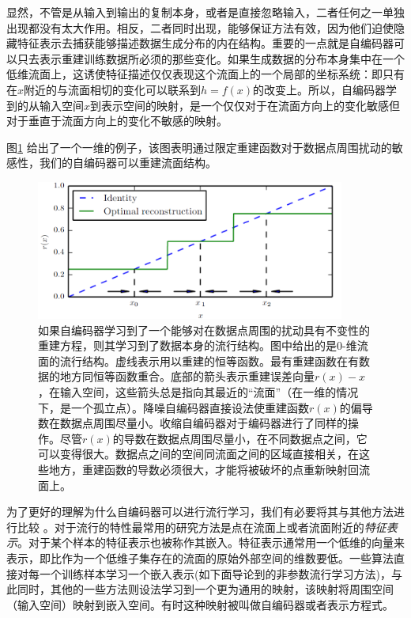 显然，不管是从输入到输出的复制本身，或者是直接忽略输入，二者任何之一单独出现都没有太大作用。相反，二者同时出现，能够保证方法有效，因为他们迫使隐藏特征表示去捕获能够描述数据生成分布的内在结构。重要的一点就是自编码器可以只去表示重建训练数据所必须的那些变化。如果生成数据的分布本身集中在一个低维流面上，这诱使特征描述仅仅表现这个流面上的一个局部的坐标系统：即只有在$x$附近的与流面相切的变化可以联系到$h = f(x)$的改变上。所以，自编码器学到的从输入空间$x$到表示空间的映射，是一个仅仅对于在流面方向上的变化敏感但对于垂直于流面方向上的变化不敏感的映射。

图\ref{fig:14.7} 给出了一个一维的例子，该图表明通过限定重建函数对于数据点周围扰动的敏感性，我们的自编码器可以重建流面结构。
\begin{figure}[htbp] %
   \centering
   \includegraphics[width=4in]{fig/chap14/14_7.png} 
   \caption{如果自编码器学习到了一个能够对在数据点周围的扰动具有不变性的重建方程，则其学习到了数据本身的流行结构。图中给出的是0-维流面的流行结构。虚线表示用以重建的恒等函数。最有重建函数在有数据的地方同恒等函数重合。底部的箭头表示重建误差向量$r(x)-x$，在输入空间，这些箭头总是指向其最近的“流面”（在一维的情况下，是一个孤立点）。降噪自编码器直接设法使重建函数$r(x)$的偏导数在数据点周围尽量小。收缩自编码器对于编码器进行了同样的操作。尽管$r(x)$的导数在数据点周围尽量小，在不同数据点之间，它可以变得很大。数据点之间的空间同流面之间的区域直接相关，在这些地方，重建函数的导数必须很大，才能将被破坏的点重新映射回流面上。}
   \label{fig:14.7}
\end{figure}

为了更好的理解为什么自编码器可以进行流行学习，我们有必要将其与其他方法进行比较 。对于流行的特性最常用的研究方法是点在流面上或者流面附近的\emph{特征表示}。对于某个样本的特征表示也被称作其嵌入。特征表示通常用一个低维的向量来表示，即比作为一个低维子集存在的流面的原始外部空间的维数要低。一些算法直接对每一个训练样本学习一个嵌入表示(如下面导论到的非参数流行学习方法)，与此同时，其他的一些方法则设法学习到一个更为通用的映射，该映射将周围空间（输入空间）映射到嵌入空间。有时这种映射被叫做自编码器或者表示方程式。 

